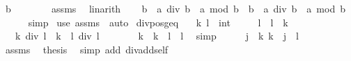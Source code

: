 \begin{isabellebody}
\ {\isachardoublequoteopen}b\ {\isasymnoteq}\ {}{\isachardoublequoteclose}\isanewline
\ \ \ \ \isamarkupfalse%
\ assms\ \isamarkupfalse%
\ linarith\isanewline
\ \ \isamarkupfalse%
\ {\isachardoublequoteopen}b\ {\isacharasterisk}{\kern0pt}\ {\isacharparenleft}{\kern0pt}a\ div\ b{\isacharparenright}{\kern0pt}\ {\isacharplus}{\kern0pt}\ a\ mod\ b\ {\isacharequal}{\kern0pt}\ b{\isacharprime}{\kern0pt}\ {\isacharasterisk}{\kern0pt}\ {\isacharparenleft}{\kern0pt}a\ div\ b{\isacharprime}{\kern0pt}{\isacharparenright}{\kern0pt}\ {\isacharplus}{\kern0pt}\ a\ mod\ b{\isacharprime}{\kern0pt}{\isachardoublequoteclose}\isanewline
\ \ \ \ \isamarkupfalse%
\ simp\isanewline
{}\isamarkupfalse%
\ {\isacharparenleft}{\kern0pt}use\ assms\ \ auto{\isacharparenright}{\kern0pt}%
\endisatagproof
{\isafoldproof}%
%
\isadelimproof
\isanewline
%
\endisadelimproof
\isanewline
{}\isamarkupfalse%
\ div{\isacharunderscore}{\kern0pt}pos{\isacharunderscore}{\kern0pt}geq{\isacharcolon}{\kern0pt}\isanewline
\ \ \ k\ l\ {\isacharcolon}{\kern0pt}{\isacharcolon}{\kern0pt}\ int\isanewline
\ \ \ {\isachardoublequoteopen}{}\ {\isacharless}{\kern0pt}\ l{\isachardoublequoteclose}\ \ {\isachardoublequoteopen}l\ {\isasymle}\ k{\isachardoublequoteclose}\isanewline
\ \ \ {\isachardoublequoteopen}k\ div\ l\ {\isacharequal}{\kern0pt}\ {\isacharparenleft}{\kern0pt}k\ {\isacharminus}{\kern0pt}\ l{\isacharparenright}{\kern0pt}\ div\ l\ {\isacharplus}{\kern0pt}\ {}{\isachardoublequoteclose}\isanewline
%
\isadelimproof
%
\endisadelimproof
%
\isatagproof
{}\isamarkupfalse%
\ {\isacharminus}{\kern0pt}\isanewline
\ \ \isamarkupfalse%
\ {\isachardoublequoteopen}k\ {\isacharequal}{\kern0pt}\ {\isacharparenleft}{\kern0pt}k\ {\isacharminus}{\kern0pt}\ l{\isacharparenright}{\kern0pt}\ {\isacharplus}{\kern0pt}\ l{\isachardoublequoteclose}\ \isamarkupfalse%
\ simp\isanewline
\ \ \isamarkupfalse%
\ \isamarkupfalse%
\ j\ \ k{\isacharcolon}{\kern0pt}\ {\isachardoublequoteopen}k\ {\isacharequal}{\kern0pt}\ j\ {\isacharplus}{\kern0pt}\ l{\isachardoublequoteclose}\ \isacommand{{\isachardot}{\kern0pt}{\isachardot}{\kern0pt}}\isamarkupfalse%
\isanewline
\ \ \isamarkupfalse%
\ assms\ \isamarkupfalse%
\ {\isacharquery}{\kern0pt}thesis\ \isamarkupfalse%
\ {\isacharparenleft}{\kern0pt}simp\ add{\isacharcolon}{\kern0pt}\ div{\isacharunderscore}{\kern0pt}add{\isacharunderscore}{\kern0pt}self{}{\isacharparenright}{\kern0pt}\isanewline

\end{isabellebody}
